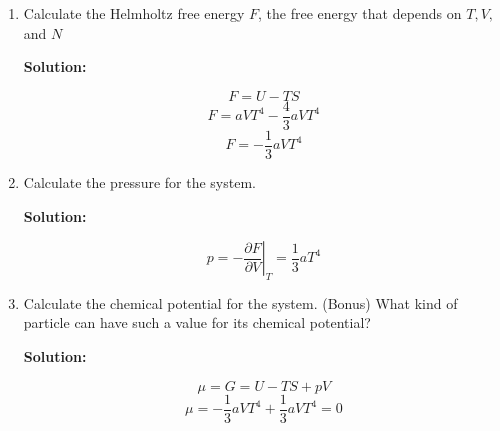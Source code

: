 \documentclass[10pt]{article}
\newenvironment{Solution}
    {\textbf{Solution:}
    
    \vspace{5mm}
    \begin{tcolorbox}
    }
    {
    \end{tcolorbox}
    \vspace{5mm}
    }
\begin{document}
\begin{enumerate}
\begin{enumerate}
\item Calculate the Helmholtz free energy $F$, the free energy that depends on
$T, V,$ and $N$

\begin{Solution}
\begin{equation}
    F = U - TS
\end{equation}
\begin{equation}
    F = aVT^4 - \frac{4}{3}aVT^4
\end{equation}
\begin{equation}
    \boxed{F = -\frac{1}{3}aVT^4}
\end{equation}
\end{Solution}

\item Calculate the pressure for the system.

\begin{Solution}
\begin{equation}
    p = -\left.\frac{\partial F}{\partial V}\right|_T = \boxed{\frac{1}{3}aT^4}
\end{equation}
\end{Solution}

\item Calculate the chemical potential for the system. (Bonus) What kind of particle can have such a value for its chemical potential?

\begin{Solution}
\begin{equation}
    \mu = G = U - T S + p V
\end{equation}
\begin{equation}
    \boxed{\mu = -\frac{1}{3}aVT^4 + \frac{1}{3}aVT^4 = 0}
\end{equation}
\end{Solution}
    
\end{enumerate}
\end{enumerate}
\end{document}
